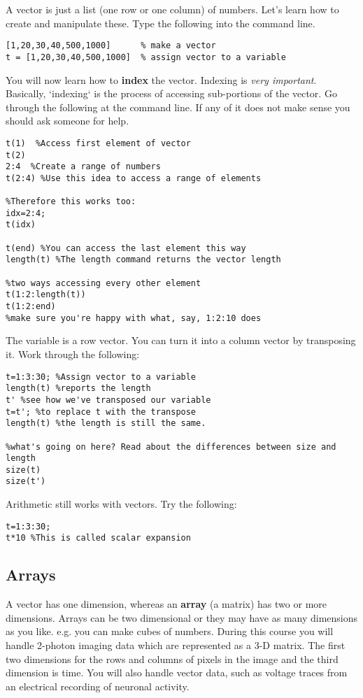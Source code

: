 \documentclass{article}
\begin{document}
A vector is just a list (one row or one column) of numbers.
Let's learn how to create and manipulate these.
Type the following into the command line.
\begin{lstlisting}
[1,20,30,40,500,1000]      % make a vector
t = [1,20,30,40,500,1000]  % assign vector to a variable
\end{lstlisting}

You will now learn how to \textbf{index} the vector. Indexing is \textit{very important}. Basically, `indexing`
is the process of accessing sub-portions of the vector. Go through the following at the command line. If any of it
does not make sense you should ask someone for help. 
\begin{lstlisting}
t(1)  %Access first element of vector
t(2)
2:4  %Create a range of numbers
t(2:4) %Use this idea to access a range of elements

%Therefore this works too:
idx=2:4;
t(idx)

t(end) %You can access the last element this way
length(t) %The length command returns the vector length

%two ways accessing every other element
t(1:2:length(t))
t(1:2:end)
%make sure you're happy with what, say, 1:2:10 does
\end{lstlisting}

The variable  is a row vector. You can turn it into a column vector by transposing it. Work through the following:

\begin{lstlisting}
t=1:3:30; %Assign vector to a variable
length(t) %reports the length
t' %see how we've transposed our variable
t=t'; %to replace t with the transpose
length(t) %the length is still the same. 

%what's going on here? Read about the differences between size and length
size(t)
size(t')

\end{lstlisting}

Arithmetic still works with vectors. Try the following:

\begin{lstlisting}
t=1:3:30; 
t*10 %This is called scalar expansion
\end{lstlisting}


\subsection*{Arrays}
A vector has one dimension, whereas an \textbf{array} (a matrix) has two or more dimensions. 
Arrays can be two dimensional or they may have as many dimensions as you like. e.g. you can make cubes of numbers.
During this course you will handle 2-photon imaging data which are represented as a 3-D matrix. The first two dimensions
for the rows and columns of pixels in the image and the third dimension is time. You will also handle vector data, such as
voltage traces from an electrical recording of neuronal activity. 
\end{document}
